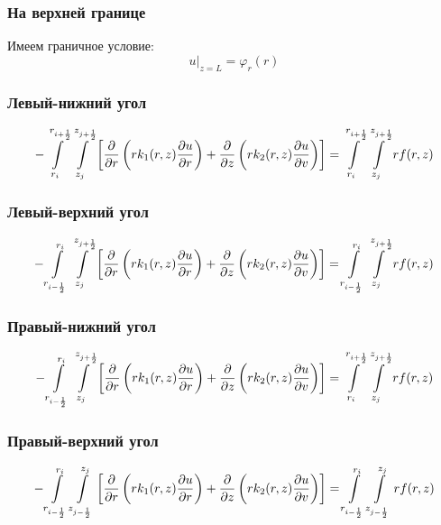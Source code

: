 \subsubsection{На верхней границе}
Имеем граничное условие:
\[
  \left . u \right \vert_{z=L} = \varphi_r(r) 
\]

\subsubsection{Левый-нижний угол}
\[
  - \int\limits^{r_{i +\frac{1}{2}}}_{r_{i }} \int\limits^{z_{j +\frac{1}{2}}}_{z_{j }} \left [ \pdv{}{r} \left ( r k_1(r, z) \pdv{u}{r} \right ) 
  + \pdv{}{z} \left ( rk_2(r, z)\pdv{u}{v} \right ) \right ] = \int\limits^{r_{i +\frac{1}{2}}}_{r_{i }} \int\limits^{z_{j +\frac{1}{2}}}_{z_{j }} rf(r, z)
\]
\subsubsection{Левый-верхний угол}
\[
  - \int\limits^{r_{i }}_{r_{i -\frac{1}{2}}} \int\limits^{z_{j +\frac{1}{2}}}_{z_{j }} \left [ \pdv{}{r} \left ( r k_1(r, z) \pdv{u}{r} \right ) 
  + \pdv{}{z} \left ( rk_2(r, z)\pdv{u}{v} \right ) \right ] = \int\limits^{r_{i }}_{r_{i -\frac{1}{2}}} \int\limits^{z_{j +\frac{1}{2}}}_{z_{j }} rf(r, z)
\]
\subsubsection{Правый-нижний угол}
\[
  - \int\limits^{r_{i }}_{r_{i -\frac{1}{2}}} \int\limits^{z_{j +\frac{1}{2}}}_{z_{j }} \left [ \pdv{}{r} \left ( r k_1(r, z) \pdv{u}{r} \right ) 
  + \pdv{}{z} \left ( rk_2(r, z)\pdv{u}{v} \right ) \right ] = \int\limits^{r_{i +\frac{1}{2}}}_{r_{i }} \int\limits^{z_{j +\frac{1}{2}}}_{z_{j }} rf(r, z)
\]
\subsubsection{Правый-верхний угол}
\[
  - \int\limits^{r_{i }}_{r_{i -\frac{1}{2}}} \int\limits^{z_{j }}_{z_{j -\frac{1}{2}}} \left [ \pdv{}{r} \left ( r k_1(r, z) \pdv{u}{r} \right ) 
  + \pdv{}{z} \left ( rk_2(r, z)\pdv{u}{v} \right ) \right ] = \int\limits^{r_{i }}_{r_{i -\frac{1}{2}}} \int\limits^{z_{j }}_{z_{j -\frac{1}{2}}} rf(r, z)
\]
